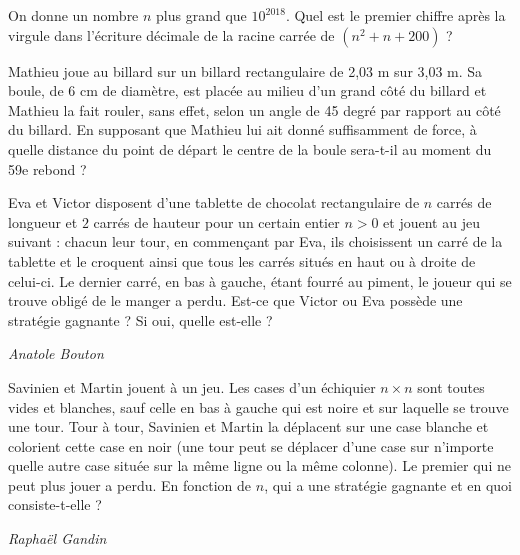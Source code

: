  
\begin{exo}{}
On donne un nombre $n$ plus grand que $10^{2018}$.
Quel est le premier chiffre après la virgule dans l’écriture décimale de la racine carrée de $(n^2 +n+200)$ ?
 \end{exo}

\begin{exo}{}

Mathieu joue au billard sur un billard rectangulaire de
2,03 m sur 3,03 m. Sa boule, de 6 cm de diamètre, est
placée au milieu d’un grand côté du billard et Mathieu la
fait rouler, sans effet, selon un angle de 45 degré par rapport
au côté du billard.
En supposant que Mathieu lui ait donné suffisamment
de force, à quelle distance du point de départ le centre
de la boule sera-t-il au moment du 59e rebond ?

\end{exo}



\begin{exo}{}
Eva et Victor disposent d'une tablette de chocolat rectangulaire de $n$ carrés de longueur et $2$ carrés de hauteur pour un certain entier $n>0$ et jouent au jeu suivant : chacun leur tour, en commençant par Eva, ils choisissent un carré de la tablette et le croquent ainsi que tous les carrés situés en haut ou à droite de celui-ci. Le dernier carré, en bas à gauche, étant fourré au piment, le joueur qui se trouve obligé de le manger a perdu. Est-ce que Victor ou Eva possède une stratégie gagnante ? Si oui, quelle est-elle ?

\medskip
\textit{Anatole Bouton}
\end{exo}




\begin{exo}{}
Savinien et Martin jouent à un jeu. Les cases d'un échiquier $n\times n$ sont toutes vides et blanches, sauf celle en bas à gauche qui est noire et sur laquelle se trouve une tour. Tour à tour, Savinien et Martin la déplacent sur une case blanche et colorient cette case en noir (une tour peut se déplacer d'une case sur n'importe quelle autre case située sur la même ligne ou la même colonne). Le premier qui ne peut plus jouer a perdu. En fonction de $n$, qui a une stratégie gagnante et en quoi consiste-t-elle ?%

\medskip
\textit{Raphaël Gandin}
\end{exo}

